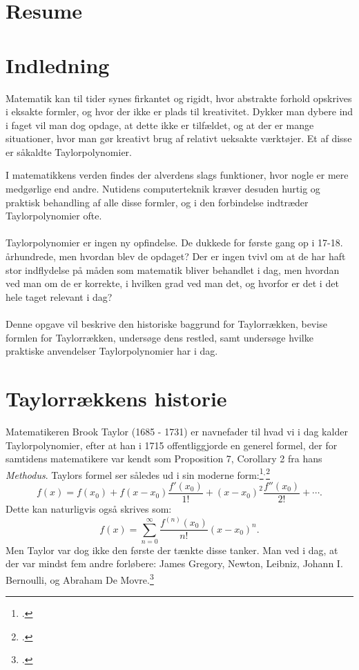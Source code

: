 \documentclass[12pt, a4paper]{article}
\begin{document}
\begin{refsection}
\section*{Resume} %
\blindtext[1-2]
\tableofcontents
\newpage



\section{Indledning} %
Matematik kan til tider synes firkantet og rigidt, hvor abstrakte forhold opskrives i eksakte formler, og hvor der ikke er plads til kreativitet. 
Dykker man dybere ind i faget vil man dog opdage, at dette ikke er tilfældet, og at der er mange situationer, hvor man gør kreativt brug af relativt ueksakte værktøjer. Et af disse er såkaldte Taylorpolynomier.


I matematikkens verden findes der alverdens slags funktioner, hvor nogle er mere medgørlige end andre. Nutidens computerteknik kræver desuden hurtig og praktisk behandling af alle disse formler, og i den forbindelse indtræder Taylorpolynomier ofte.\\
\\
Taylorpolynomier er ingen ny opfindelse. De dukkede for første gang op i 17-18. århundrede, men hvordan blev de opdaget? Der er ingen tvivl om at de har haft stor indflydelse på måden som matematik bliver behandlet i dag, men hvordan ved man om de er korrekte, i hvilken grad ved man det, og hvorfor er det i det hele taget relevant i dag?\\
\\
Denne opgave vil beskrive den historiske baggrund for Taylorrækken, bevise formlen for Taylorrækken, undersøge dens restled, samt undersøge hvilke praktiske anvendelser Taylorpolynomier har i dag.

\section{Taylorrækkens historie} %
Matematikeren Brook Taylor (1685 - 1731) er navnefader til hvad vi i dag kalder Taylorpolynomier, efter at han i 1715 offentliggjorde en generel formel, der for samtidens matematikere var kendt som Proposition 7, Corollary 2 fra hans \textit{Methodus}.
Taylors formel ser således ud i sin moderne form:\footcite[s. 247]{roy_2021}$^,$\footcite[s. 72]{feigenbaum_exact_sciences}
\begin{equation*}
   f(x)=f(x_0)+f(x-x_0)\frac{f'(x_0)}{1!}+(x-x_0)^2\frac{f''(x_0)}{2!}+\cdots. 
\end{equation*}
Dette kan naturligvis også skrives som:
\begin{equation*}
    f(x)=\sum_{n=0}^{\infty}\frac{f^{(n)}(x_0)}{n!}(x-x_0)^n.
\end{equation*}
Men Taylor var dog ikke den første der tænkte disse tanker. Man ved i dag, at der var mindst fem andre forløbere: James Gregory, Newton, Leibniz, Johann I. Bernoulli, og Abraham De Movre.\footcite{feigenbaum_exact_sciences}

\end{refsection}
\end{document}
